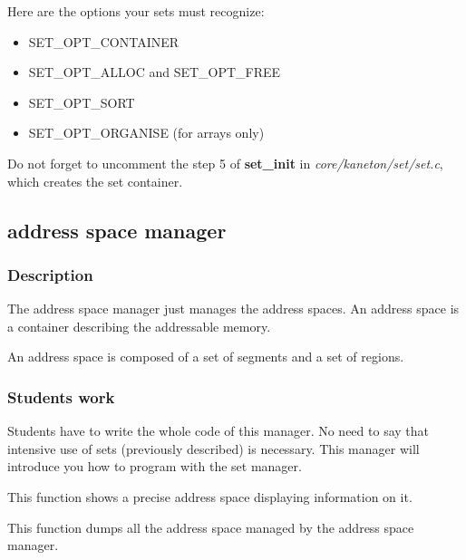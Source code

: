 Here are the options your sets must recognize:

\begin{itemize}
\item SET\_OPT\_CONTAINER
\item SET\_OPT\_ALLOC and SET\_OPT\_FREE
\item SET\_OPT\_SORT
\item SET\_OPT\_ORGANISE (for arrays only)
\end{itemize}

Do  not  forget to  uncomment  the  step  5 of  \textbf{set\_init}  in
\textit{core/kaneton/set/set.c}, which creates the set container.

%
%

\subsection{address space manager}

\subsubsection{Description}

The address space manager just  manages the address spaces. An address
space is a container describing the addressable memory.

An address space is composed of a set of segments and a set of regions.

\subsubsection{Students work}

Students have to write the whole  code of this manager. No need to say
that intensive use of  sets (previously described) is necessary.  This
manager will introduce you how to program with the set manager.


This function shows a precise address space displaying information
on it.


This function dumps all the address space managed by the address
space manager.


